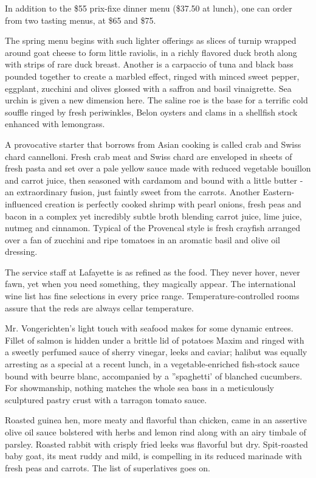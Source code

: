 In addition to the \$55 prix-fixe dinner menu (\$37.50 at lunch), one
can order from two tasting menus, at \$65 and \$75.

The spring menu begins with such lighter offerings as slices of turnip
wrapped around goat cheese to form little raviolis, in a richly flavored
duck broth along with strips of rare duck breast. Another is a carpaccio
of tuna and black bass pounded together to create a marbled effect,
ringed with minced sweet pepper, eggplant, zucchini and olives glossed
with a saffron and basil vinaigrette. Sea urchin is given a new
dimension here. The saline roe is the base for a terrific cold souffle
ringed by fresh periwinkles, Belon oysters and clams in a shellfish
stock enhanced with lemongrass.

A provocative starter that borrows from Asian cooking is called crab and
Swiss chard cannelloni. Fresh crab meat and Swiss chard are enveloped in
sheets of fresh pasta and set over a pale yellow sauce made with reduced
vegetable bouillon and carrot juice, then seasoned with cardamom and
bound with a little butter - an extraordinary fusion, just faintly sweet
from the carrots. Another Eastern-influenced creation is perfectly
cooked shrimp with pearl onions, fresh peas and bacon in a complex yet
incredibly subtle broth blending carrot juice, lime juice, nutmeg and
cinnamon. Typical of the Provencal style is fresh crayfish arranged over
a fan of zucchini and ripe tomatoes in an aromatic basil and olive oil
dressing.

The service staff at Lafayette is as refined as the food. They never
hover, never fawn, yet when you need something, they magically appear.
The international wine list has fine selections in every price range.
Temperature-controlled rooms assure that the reds are always cellar
temperature.

Mr. Vongerichten's light touch with seafood makes for some dynamic
entrees. Fillet of salmon is hidden under a brittle lid of potatoes
Maxim and ringed with a sweetly perfumed sauce of sherry vinegar, leeks
and caviar; halibut was equally arresting as a special at a recent
lunch, in a vegetable-enriched fish-stock sauce bound with beurre blanc,
accompanied by a ''spaghetti' of blanched cucumbers. For showmanship,
nothing matches the whole sea bass in a meticulously sculptured pastry
crust with a tarragon tomato sauce.

Roasted guinea hen, more meaty and flavorful than chicken, came in an
assertive olive oil sauce bolstered with herbs and lemon rind along with
an airy timbale of parsley. Roasted rabbit with crisply fried leeks was
flavorful but dry. Spit-roasted baby goat, its meat ruddy and mild, is
compelling in its reduced marinade with fresh peas and carrots. The list
of superlatives goes on.

